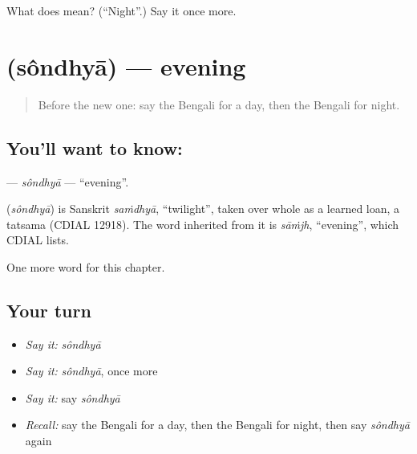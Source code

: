 \begin{tcolorbox}[breakable,colback=teal!4,colframe=teal!35!black,title={Before you move on}]
What does  mean? (\textquotedblleft{}Night\textquotedblright{}.) Say it once more.
\end{tcolorbox}
\section[\texorpdfstring{\bn{সন্ধ্যা} (sôndhyā)}{সন্ধ্যা (sôndhyā)}]{ (sôndhyā) — evening}

\label{lesson:BN-C78-sondhya}



\begin{quote}
Before the new one: say the Bengali for a day, then the Bengali for night.
\end{quote}

\subsection*{You'll want to know: }
\textbf{} — \emph{sôndhyā} — \textquotedblleft{}evening\textquotedblright{}.

\begin{cousinweb}
\textbf{} (\emph{sôndhyā}) is Sanskrit \emph{saṁdhyā}, \textquotedblleft{}twilight\textquotedblright{}, taken over whole as a learned loan, a tatsama (CDIAL 12918). The word inherited from it is \emph{sāṁjh}, \textquotedblleft{}evening\textquotedblright{}, which CDIAL lists.
\end{cousinweb}

\begin{grammarlens}[title={What you've built}]
One more word for this chapter.
\end{grammarlens}

\subsection*{Your turn}
\begin{itemize}
\raggedright
  \item \emph{Say it:} \emph{sôndhyā}
  \item \emph{Say it:} \emph{sôndhyā}, once more
  \item \emph{Say it:} say \emph{sôndhyā}
  \item \emph{Recall:} say the Bengali for a day, then the Bengali for night, then say \emph{sôndhyā} again
\end{itemize}

